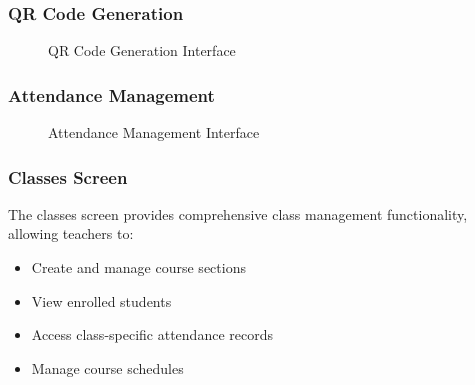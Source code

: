 \subsubsection{QR Code Generation}
\begin{figure}[H]
    \centering
    \caption{QR Code Generation Interface}
    \label{fig:qr_generation}
\end{figure}

\subsubsection{Attendance Management}
\begin{figure}[H]
    \centering
    \caption{Attendance Management Interface}
    \label{fig:attendance_management}
\end{figure}

\subsubsection{Classes Screen}
The classes screen provides comprehensive class management functionality, allowing teachers to:
\begin{itemize}
    \item Create and manage course sections
    \item View enrolled students
    \item Access class-specific attendance records
    \item Manage course schedules
\end{itemize}

